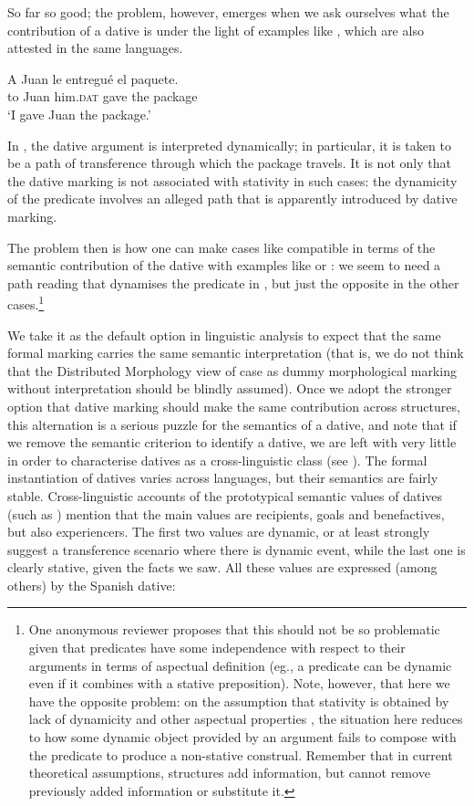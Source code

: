 \documentclass[output=paper,colorlinks,citecolor=brown,nonflat]{./langscibook}
\begin{document}
So far so good; the problem, however, emerges when we ask ourselves what the contribution of a dative is under the light of examples like , which are also attested in the same languages. 

\ea%
    \label{ex:fabregas:9}
    \gll    A Juan le       entregué el  paquete.\\
            {to} {Juan} {him.}\textsc{dat}   {gave}    {the} {package}\\
    \glt `I gave Juan the package.'
    \z

In , the dative argument is interpreted dynamically; in particular, it is taken to be a path of transference through which the package travels. It is not only that the dative marking is not associated with stativity in such cases: the dynamicity of the predicate involves an alleged path that is apparently introduced by dative marking.

The problem then is how one can make cases like  compatible in terms of the semantic contribution of the dative with examples like  or : we seem to need a path reading that dynamises the predicate in , but just the opposite in the other cases.\footnote{One anonymous reviewer proposes that this should not be so problematic given that predicates have some independence with respect to their arguments in terms of aspectual definition (eg., a predicate can be dynamic even if it combines with a stative preposition). Note, however, that here we have the opposite problem: on the assumption that stativity is obtained by lack of dynamicity and other aspectual properties \citet{JaqueHidalgo2014}, the situation here reduces to how some dynamic object provided by an argument fails to compose with the predicate to produce a non-stative construal. Remember that in current theoretical assumptions, structures add information, but cannot remove previously added information or substitute it.} 

We take it as the default option in linguistic analysis to expect that the same formal marking carries the same semantic interpretation (that is, we do not think that the Distributed Morphology view of case as dummy morphological marking without interpretation should be blindly assumed). Once we adopt the stronger option that dative marking should make the same contribution across structures, this alternation is a serious puzzle for the semantics of a dative, and note that if we remove the semantic criterion to identify a dative, we are left with very little in order to characterise datives as a cross-linguistic class (see ). The formal instantiation of datives varies across languages, but their semantics are fairly stable. Cross-linguistic accounts of the prototypical semantic values of datives (such as \citealt{Næss2009}) mention that the main values are recipients, goals and benefactives, but also experiencers. The first two values are dynamic, or at least strongly suggest a transference scenario where there is dynamic event, while the last one is clearly stative, given the facts we saw. All these values are expressed (among others) by the Spanish dative:
\end{document}
